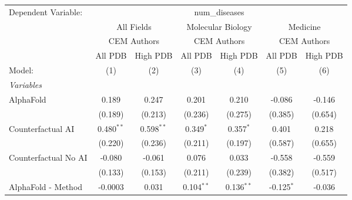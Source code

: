 \begingroup
\centering
\begin{tabular}{lcccccc}
   \tabularnewline \midrule \midrule
   Dependent Variable: & \multicolumn{6}{c}{num\_diseases}\\
 & \multicolumn{2}{c}{All Fields} & \multicolumn{2}{c}{Molecular Biology} & \multicolumn{2}{c}{Medicine} \\
\cmidrule(lr){2-3} \cmidrule(lr){4-5} \cmidrule(lr){6-7}
 & \multicolumn{2}{c}{CEM Authors} & \multicolumn{2}{c}{CEM Authors} & \multicolumn{2}{c}{CEM Authors} \\
\cmidrule(lr){2-3} \cmidrule(lr){4-5} \cmidrule(lr){6-7}
 & \multicolumn{1}{c}{All PDB} & \multicolumn{1}{c}{High PDB} & \multicolumn{1}{c}{All PDB} & \multicolumn{1}{c}{High PDB} & \multicolumn{1}{c}{All PDB} & \multicolumn{1}{c}{High PDB} \\
\cmidrule(lr){2-2} \cmidrule(lr){3-3} \cmidrule(lr){4-4} \cmidrule(lr){5-5} \cmidrule(lr){6-6} \cmidrule(lr){7-7}
   Model:                                                     & (1)           & (2)           & (3)           & (4)           & (5)            & (6)\\  
   \midrule
   \emph{Variables}\\
   AlphaFold                                                  & 0.189         & 0.247         & 0.201         & 0.210         & -0.086         & -0.146\\   
                                                              & (0.189)       & (0.213)       & (0.236)       & (0.275)       & (0.385)        & (0.654)\\   
   Counterfactual AI                                          & 0.480$^{**}$  & 0.598$^{**}$  & 0.349$^{*}$   & 0.357$^{*}$   & 0.401          & 0.218\\   
                                                              & (0.220)       & (0.236)       & (0.211)       & (0.197)       & (0.587)        & (0.655)\\   
   Counterfactual No AI                                       & -0.080        & -0.061        & 0.076         & 0.033         & -0.558         & -0.559\\   
                                                              & (0.133)       & (0.153)       & (0.211)       & (0.239)       & (0.382)        & (0.517)\\   
   AlphaFold - Method                                         & -0.0003       & 0.031         & 0.104$^{**}$  & 0.136$^{**}$  & -0.125$^{*}$   & -0.036\\   

\end{tabular}
